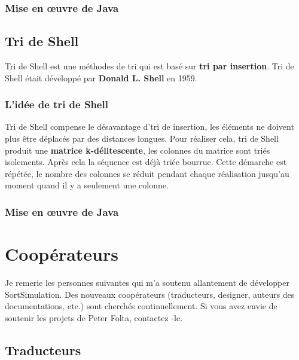\documentclass[11pt, a4paper, titlepage, twoside]{article}
\renewcommand{\emph}{\textbf}
\begin{document}
	\subsubsection{Mise en œuvre de Java}
	
	
	
	\subsection{Tri de Shell}
	
	Tri de Shell est une méthodes de tri qui est basé sur \emph{tri par insertion}. Tri de Shell était développé par \emph{Donald L. Shell} en 1959.
	
	\subsubsection{L'idée de tri de Shell}
	
	Tri de Shell compense le désavantage d'tri de insertion, les éléments ne doivent plus être déplacés par des distances longues. Pour réaliser cela, tri de Shell produit une \emph{matrice k-délitescente}, les colonnes du matrice sont triés isolements. Après cela la séquence est déjà triée bourrue. Cette démarche est répétée, le nombre des colonnes se réduit pendant chaque réalisation jusqu'au moment quand il y a seulement une colonne.
	
	\subsubsection{Mise en œuvre de Java}
	
	
	
	\section{Coopérateurs}
	
	Je remerie les personnes suivantes qui m'a soutenu allantement de développer SortSimulation. Des nouveaux coopérateurs (traducteurs, designer, auteurs des documentations, etc.) sont cherchés continuellement. Si vous avez envie de soutenir les projets de Peter Folta, contactez -le.
	
	\subsection{Traducteurs}
	
\end{document}
